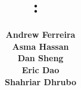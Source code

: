 \lfoot{} %
\cfoot{} %

\renewcommand\headrulewidth{0.5pt} %



\author{\textbf{Andrew Ferreira} \\ \textbf{Asma Hassan} \\ \textbf{Dan Sheng} \\ \textbf{Eric Dao} \\ \textbf{Shahriar Dhrubo}} %
\date{} %

\title{
	\thispagestyle{empty} %
	\vspace{0.2\textheight} %
	\textbf{\reportClass:\ \reportTitle}\\[-4pt]
	\ifdef{\reportProject}{{\large \reportProject}\\}{} %
	\ifdef{\reportClassInstructor}{{\large \textit{\reportClassInstructor}}}{} %
	\vspace{0.22\textheight} %
}


